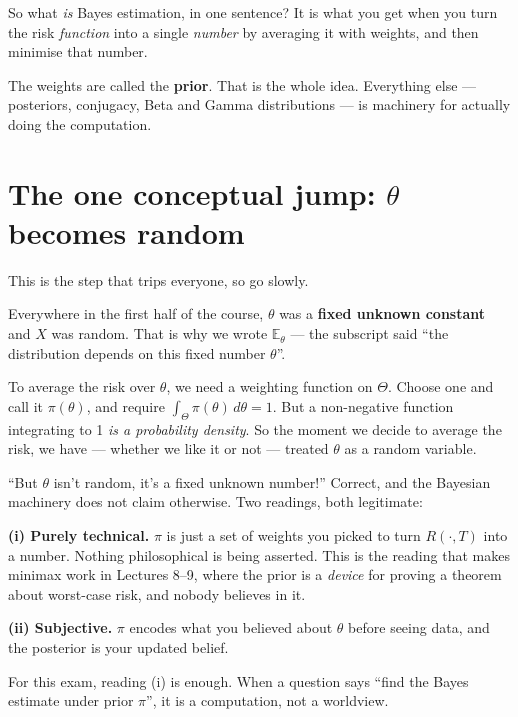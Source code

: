 \documentclass[11pt]{article}
\newcommand{\E}{\mathbb{E}}
\begin{document}
\begin{idea}{So what \emph{is} Bayes estimation, in one sentence?}
It is what you get when you turn the risk \emph{function} into a single \emph{number} by
averaging it with weights, and then minimise that number.

The weights are called the \textbf{prior}. That is the whole idea. Everything else ---
posteriors, conjugacy, Beta and Gamma distributions --- is machinery for actually doing the
computation.
\end{idea}

\section{The one conceptual jump: $\theta$ becomes random}

This is the step that trips everyone, so go slowly.

Everywhere in the first half of the course, $\theta$ was a \textbf{fixed unknown constant} and
$X$ was random. That is why we wrote $\E_\theta$ --- the subscript said ``the distribution
depends on this fixed number $\theta$''.

To average the risk over $\theta$, we need a weighting function on $\Theta$. Choose one and
call it $\pi(\theta)$, and require $\int_\Theta\pi(\theta)\,d\theta=1$. But a non-negative
function integrating to 1 \emph{is a probability density}. So the moment we decide to average
the risk, we have --- whether we like it or not --- treated $\theta$ as a random variable.

\begin{confusion}{``But $\theta$ isn't random, it's a fixed unknown number!''}
Correct, and the Bayesian machinery does not claim otherwise. Two readings, both legitimate:

\smallskip
\textbf{(i) Purely technical.} $\pi$ is just a set of weights you picked to turn
$R(\cdot,T)$ into a number. Nothing philosophical is being asserted. This is the reading that
makes minimax work in Lectures 8--9, where the prior is a \emph{device} for proving a theorem
about worst-case risk, and nobody believes in it.

\smallskip
\textbf{(ii) Subjective.} $\pi$ encodes what you believed about $\theta$ before seeing data,
and the posterior is your updated belief.

\smallskip
For this exam, reading (i) is enough. When a question says ``find the Bayes estimate under
prior $\pi$'', it is a computation, not a worldview.
\end{confusion}
\end{document}

